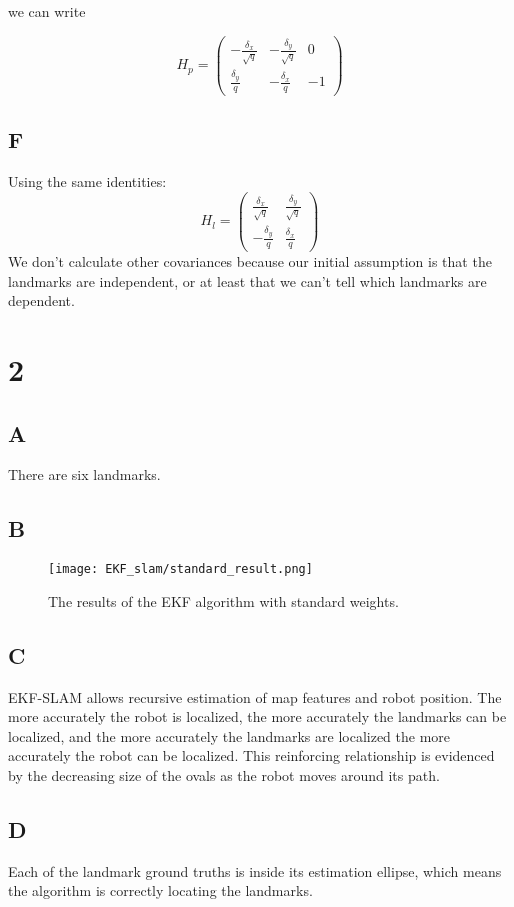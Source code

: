 \documentclass[letterpaper]{article}
\begin{document}
we can write 

$$
H_p = \left(\begin{array}{ccc} -\frac{\delta _{x}}{\sqrt{q}} & -\frac{\delta _{y}}{\sqrt{q}} & 0\\ \frac{\delta _{y}}{q} & -\frac{\delta _{x}}{q} & -1 \end{array}\right)
$$

\subsection*{F}
Using the same identities: 
$$
H_l =\left(\begin{array}{cc} \frac{\delta _{x}}{\sqrt{q}} & \frac{\delta _{y}}{\sqrt{q}}\\ -\frac{\delta _{y}}{q} & \frac{\delta _{x}}{q} \end{array}\right) 
$$
We don't calculate other covariances because our initial assumption is that the landmarks are independent, or at least
that we can't tell which landmarks are dependent.
\section*{2}
\subsection*{A}
There are six landmarks.
\subsection*{B}
\begin{figure}[H]
    \texttt{[image: EKF\_slam/standard\_result.png]}
    \caption{The results of the EKF algorithm with standard weights.}
\end{figure}
\subsection*{C}
EKF-SLAM allows recursive estimation of map features and robot position. The more accurately the 
robot is localized, the more accurately the landmarks can be localized, and the more accurately the landmarks 
are localized the more accurately the robot can be localized. This reinforcing relationship is evidenced by the 
decreasing size of the ovals as the robot moves around its path.
\subsection*{D}
Each of the landmark ground truths is inside its estimation ellipse, which means the algorithm is correctly locating 
the landmarks. 
\end{document}
